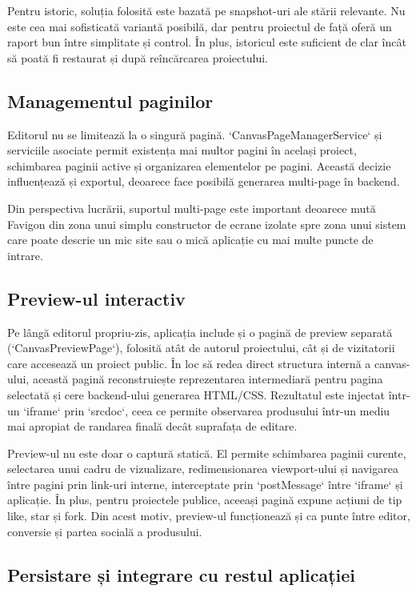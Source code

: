 Pentru istoric, soluția folosită este bazată pe snapshot-uri ale stării relevante. Nu este cea mai sofisticată variantă posibilă, dar pentru proiectul de față oferă un raport bun între simplitate și control. În plus, istoricul este suficient de clar încât să poată fi restaurat și după reîncărcarea proiectului.

\subsection{Managementul paginilor}

Editorul nu se limitează la o singură pagină. `CanvasPageManagerService` și serviciile asociate permit existența mai multor pagini în același proiect, schimbarea paginii active și organizarea elementelor pe pagini. Această decizie influențează și exportul, deoarece face posibilă generarea multi-page în backend.

Din perspectiva lucrării, suportul multi-page este important deoarece mută Favigon din zona unui simplu constructor de ecrane izolate spre zona unui sistem care poate descrie un mic site sau o mică aplicație cu mai multe puncte de intrare.

\subsection{Preview-ul interactiv}

Pe lângă editorul propriu-zis, aplicația include și o pagină de preview separată (`CanvasPreviewPage`), folosită atât de autorul proiectului, cât și de vizitatorii care accesează un proiect public. În loc să redea direct structura internă a canvas-ului, această pagină reconstruiește reprezentarea intermediară pentru pagina selectată și cere backend-ului generarea HTML/CSS. Rezultatul este injectat într-un `iframe` prin `srcdoc`, ceea ce permite observarea produsului într-un mediu mai apropiat de randarea finală decât suprafața de editare.

Preview-ul nu este doar o captură statică. El permite schimbarea paginii curente, selectarea unui cadru de vizualizare, redimensionarea viewport-ului și navigarea între pagini prin link-uri interne, interceptate prin `postMessage` între `iframe` și aplicație. În plus, pentru proiectele publice, aceeași pagină expune acțiuni de tip like, star și fork. Din acest motiv, preview-ul funcționează și ca punte între editor, conversie și partea socială a produsului.

\subsection{Persistare și integrare cu restul aplicației}

